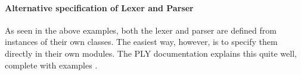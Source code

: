 \paragraph{Alternative specification of Lexer and Parser}
As seen in the above examples, both the lexer and parser are defined
from instances of their own classes. The easiest way, however, is to
specify them directly in their own modules. The PLY documentation
explains this quite well, complete with examples \citep{ply:online}.
